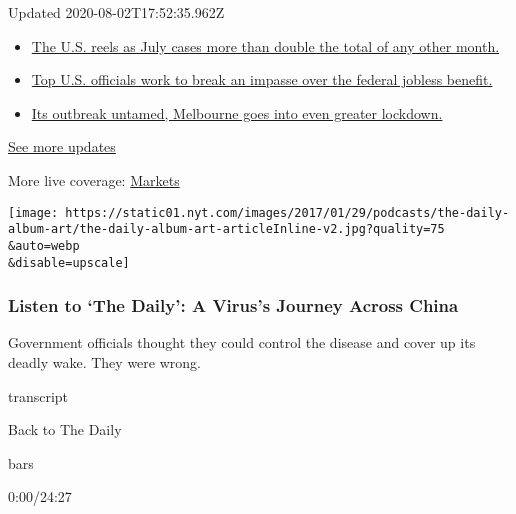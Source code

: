 Updated 2020-08-02T17:52:35.962Z

\begin{itemize}
\tightlist
\item
  \href{https://www.nytimes.com/2020/08/01/world/coronavirus-covid-19.html?action=click\&pgtype=Article\&state=default\&region=MAIN_CONTENT_1\&context=storylines_live_updates\#link-34047410}{The
  U.S. reels as July cases more than double the total of any other
  month.}
\item
  \href{https://www.nytimes.com/2020/08/01/world/coronavirus-covid-19.html?action=click\&pgtype=Article\&state=default\&region=MAIN_CONTENT_1\&context=storylines_live_updates\#link-780ec966}{Top
  U.S. officials work to break an impasse over the federal jobless
  benefit.}
\item
  \href{https://www.nytimes.com/2020/08/01/world/coronavirus-covid-19.html?action=click\&pgtype=Article\&state=default\&region=MAIN_CONTENT_1\&context=storylines_live_updates\#link-2bc8948}{Its
  outbreak untamed, Melbourne goes into even greater lockdown.}
\end{itemize}

\href{https://www.nytimes.com/2020/08/01/world/coronavirus-covid-19.html?action=click\&pgtype=Article\&state=default\&region=MAIN_CONTENT_1\&context=storylines_live_updates}{See
more updates}

More live coverage:
\href{https://www.nytimes.com/live/2020/07/31/business/stock-market-today-coronavirus?action=click\&pgtype=Article\&state=default\&region=MAIN_CONTENT_1\&context=storylines_live_updates}{Markets}

\texttt{[image: https://static01.nyt.com/images/2017/01/29/podcasts/the-daily-album-art/the-daily-album-art-articleInline-v2.jpg?quality=75\\\&auto=webp\\\&disable=upscale]}

\hypertarget{listen-to-the-daily-a-viruss-journey-across-china}{%
\subsubsection{Listen to `The Daily': A Virus's Journey Across
China}\label{listen-to-the-daily-a-viruss-journey-across-china}}

Government officials thought they could control the disease and cover up
its deadly wake. They were wrong.

transcript

Back to The Daily

bars

0:00/24:27

